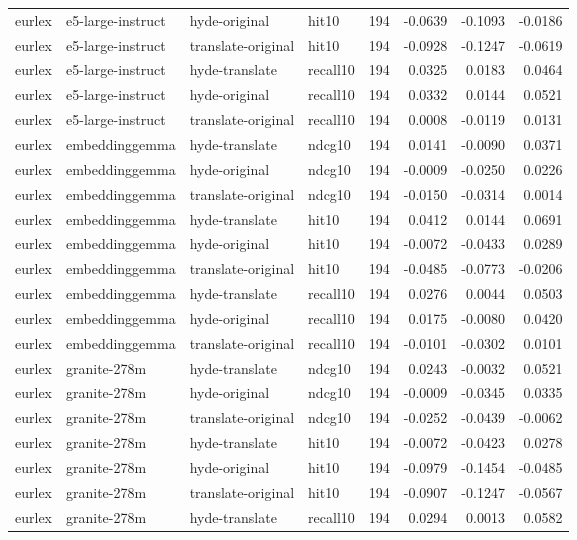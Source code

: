 \begin{tabular}{llllrrrr}
eurlex & e5-large-instruct & hyde-original & hit10 & 194 & -0.0639 & -0.1093 & -0.0186 \\
eurlex & e5-large-instruct & translate-original & hit10 & 194 & -0.0928 & -0.1247 & -0.0619 \\
eurlex & e5-large-instruct & hyde-translate & recall10 & 194 & 0.0325 & 0.0183 & 0.0464 \\
eurlex & e5-large-instruct & hyde-original & recall10 & 194 & 0.0332 & 0.0144 & 0.0521 \\
eurlex & e5-large-instruct & translate-original & recall10 & 194 & 0.0008 & -0.0119 & 0.0131 \\
eurlex & embeddinggemma & hyde-translate & ndcg10 & 194 & 0.0141 & -0.0090 & 0.0371 \\
eurlex & embeddinggemma & hyde-original & ndcg10 & 194 & -0.0009 & -0.0250 & 0.0226 \\
eurlex & embeddinggemma & translate-original & ndcg10 & 194 & -0.0150 & -0.0314 & 0.0014 \\
eurlex & embeddinggemma & hyde-translate & hit10 & 194 & 0.0412 & 0.0144 & 0.0691 \\
eurlex & embeddinggemma & hyde-original & hit10 & 194 & -0.0072 & -0.0433 & 0.0289 \\
eurlex & embeddinggemma & translate-original & hit10 & 194 & -0.0485 & -0.0773 & -0.0206 \\
eurlex & embeddinggemma & hyde-translate & recall10 & 194 & 0.0276 & 0.0044 & 0.0503 \\
eurlex & embeddinggemma & hyde-original & recall10 & 194 & 0.0175 & -0.0080 & 0.0420 \\
eurlex & embeddinggemma & translate-original & recall10 & 194 & -0.0101 & -0.0302 & 0.0101 \\
eurlex & granite-278m & hyde-translate & ndcg10 & 194 & 0.0243 & -0.0032 & 0.0521 \\
eurlex & granite-278m & hyde-original & ndcg10 & 194 & -0.0009 & -0.0345 & 0.0335 \\
eurlex & granite-278m & translate-original & ndcg10 & 194 & -0.0252 & -0.0439 & -0.0062 \\
eurlex & granite-278m & hyde-translate & hit10 & 194 & -0.0072 & -0.0423 & 0.0278 \\
eurlex & granite-278m & hyde-original & hit10 & 194 & -0.0979 & -0.1454 & -0.0485 \\
eurlex & granite-278m & translate-original & hit10 & 194 & -0.0907 & -0.1247 & -0.0567 \\
eurlex & granite-278m & hyde-translate & recall10 & 194 & 0.0294 & 0.0013 & 0.0582 \\

\end{tabular}

